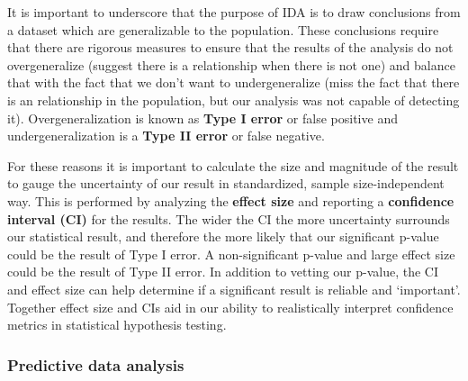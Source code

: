 \documentclass[
]{article}
\begin{document}
It is important to underscore that the purpose of IDA is to draw conclusions from a dataset which are generalizable to the population. These conclusions require that there are rigorous measures to ensure that the results of the analysis do not overgeneralize (suggest there is a relationship when there is not one) and balance that with the fact that we don't want to undergeneralize (miss the fact that there is an relationship in the population, but our analysis was not capable of detecting it). Overgeneralization is known as \textbf{Type I error} or false positive and undergeneralization is a \textbf{Type II error} or false negative.

For these reasons it is important to calculate the size and magnitude of the result to gauge the uncertainty of our result in standardized, sample size-independent way. This is performed by analyzing the \textbf{effect size} and reporting a \textbf{confidence interval (CI)} for the results. The wider the CI the more uncertainty surrounds our statistical result, and therefore the more likely that our significant p-value could be the result of Type I error. A non-significant p-value and large effect size could be the result of Type II error. In addition to vetting our p-value, the CI and effect size can help determine if a significant result is reliable and `important'. Together effect size and CIs aid in our ability to realistically interpret confidence metrics in statistical hypothesis testing.

\hypertarget{predictive-data-analysis}{%
\subsubsection{Predictive data analysis}\label{predictive-data-analysis}}
\end{document}
